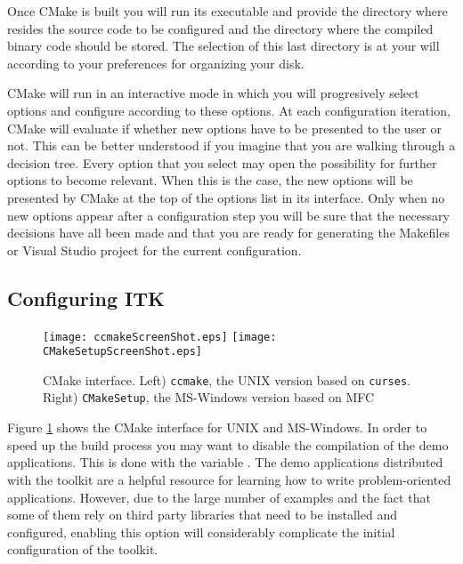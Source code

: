 Once CMake is built you will run its executable and provide the directory where
resides the source code to be configured and the directory where the compiled
binary code should be stored. The selection of this last directory is at your
will according to your preferences for organizing your disk.

CMake will run in an interactive mode in which you will progresively select
options and configure according to these options. At each configuration
iteration, CMake will evaluate if whether new options have to be presented to
the user or not. This can be better understood if you imagine that you are
walking through a decision tree.  Every option that you select may open the
possibility for further options to become relevant. When this is the case, the
new options will be presented by CMake at the top of the options list in its
interface.  Only when no new options appear after a configuration step you will
be sure that the necessary decisions have all been made and that you are ready
for generating the Makefiles or Visual Studio project for the current
configuration.

\subsection{Configuring ITK}
\label{sec:ConfiguringITKwithVTK}
  

\begin{figure}[ht]
\centering 
\texttt{[image: ccmakeScreenShot.eps]}
\texttt{[image: CMakeSetupScreenShot.eps]}
\caption{CMake interface. Left) \texttt{ccmake}, the UNIX version based on
\texttt{curses}. Right) \texttt{CMakeSetup}, the MS-Windows version based on MFC}
\label{fig:CMakeGUI}
\end{figure}

Figure \ref{fig:CMakeGUI} shows the CMake interface for UNIX and MS-Windows.
In order to speed up the build process you may want to disable the compilation
of the demo applications. This is done with the variable
. The demo applications  distributed with the
toolkit are a helpful resource for learning how to write problem-oriented
applications.  However, due to the large number of examples and the fact that
some of them rely on third party libraries that need to be installed and
configured, enabling this option will considerably complicate the initial
configuration of the toolkit.

